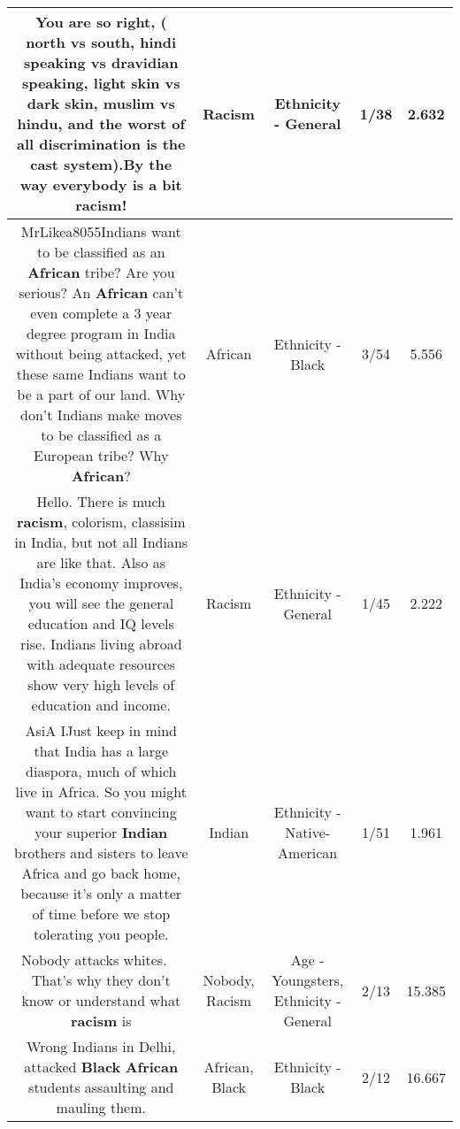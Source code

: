 \documentclass[11pt]{article}
\newlength\mylength
\begin{document}
\begin{center}
\begin{longtable}{|C{.65\mylength}|C{.30\mylength}|C{.12\mylength}|C{.12\mylength}|C{.12\mylength}|}
  \small You are so right, ( north vs south, hindi speaking vs dravidian speaking, light skin vs dark skin, muslim vs hindu, and the worst of all discrimination is the cast system).By the way everybody is a bit \textbf{racism}!\normalsize   & Racism & Ethnicity - General & 1/38 & 2.632 \\  \hline
  \small MrLikea8055Indians want to be classified as an \textbf{African} tribe? Are you serious? An \textbf{African} can't even complete a 3 year degree program in India without being attacked, yet these same Indians want to be a part of our land. Why don't Indians make moves to be classified as a European tribe? Why \textbf{African}?\normalsize   & African & Ethnicity - Black & 3/54 & 5.556 \\  \hline
  \small Hello. There is much \textbf{racism}, colorism, classisim in India, but not all Indians are like that. Also as India's economy improves, you will see the general education and IQ levels rise. Indians living abroad with adequate resources show very high levels of education and income.\normalsize   & Racism & Ethnicity - General & 1/45 & 2.222 \\  \hline
  \small AsiA IJust keep in mind that India has a large diaspora, much of which live in Africa. So you might want to start convincing your superior \textbf{Indian} brothers and sisters to leave Africa and go back home, because it's only a matter of time before we stop tolerating you people.\normalsize   & Indian & Ethnicity - Native-American & 1/51 & 1.961 \\  \hline
  \small Nobody attacks whites.   That's why they don't know or understand what \textbf{racism} is\normalsize   & Nobody, Racism & Age - Youngsters, Ethnicity - General & 2/13 & 15.385 \\  \hline
  \small Wrong Indians in Delhi, attacked \textbf{Black} \textbf{African} students assaulting and mauling them.\normalsize   & African, Black & Ethnicity - Black & 2/12 & 16.667 \\  \hline

\end{longtable}
\end{center}
\end{document}
